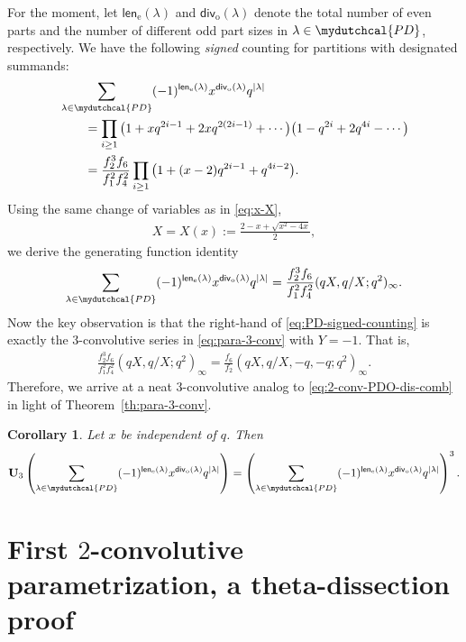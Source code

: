 \documentclass[12pt,reqno]{amsart}
\numberwithin{equation}{section}
\theoremstyle{plain}
\newtheorem{corollary}[theorem]{Corollary}
\theoremstyle{definition}
\theoremstyle{named}
\newcommand{\cPD}{\mydutchcal{PD}}
\newcommand{\dis}{\mathsf{div}}
\newcommand{\len}{\mathsf{len}}
\newcommand{\UU}{\mathbf{U}}
\begin{document}
For the moment, let $\len_{\mathrm{e}}(\lambda)$ and $\dis_{\mathrm{o}}(\lambda)$ denote the total number of even parts and the number of different odd part sizes in $\lambda\in \cPD$, respectively. We have the following \emph{signed} counting for partitions with designated summands:
\begin{align*}
	&\sum_{\lambda\in\cPD}(-1)^{\len_{\mathrm{e}}(\lambda)}x^{\dis_{\mathrm{o}}(\lambda)}q^{|\lambda|} \\
	&\qquad= \prod_{i\ge 1} \big(1+xq^{2i-1}+2xq^{2(2i-1)}+\cdots\big) \big(1 - q^{2i} + 2q^{4i} - \cdots\big)\\
	&\qquad= \frac{f_2^3 f_6}{f_1^2 f_4^2} \prod_{i\ge 1}\big(1+(x-2)q^{2i-1}+q^{4i-2}\big).
\end{align*}
Using the same change of variables as in \eqref{eq:x-X},
\begin{align*}
	X = X(x):= \frac{2-x+\sqrt{x^2-4x}}{2},
\end{align*}
we derive the generating function identity
\begin{align}\label{eq:PD-signed-counting}
	\sum_{\lambda\in\cPD}(-1)^{\len_{\mathrm{e}}(\lambda)}x^{\dis_{\mathrm{o}}(\lambda)}q^{|\lambda|} = \frac{f_2^3 f_6}{f_1^2 f_4^2} (qX,q/X;q^2)_\infty.
\end{align}
Now the key observation is that the right-hand of \eqref{eq:PD-signed-counting} is exactly the $3$-convolutive series in \eqref{eq:para-3-conv} with $Y=-1$. That is,
\begin{align*}
	\frac{f_2^3 f_6}{f_1^2 f_4^2} (qX,q/X;q^2)_\infty = \frac{f_6}{f_2} (qX,q/X,-q,-q;q^2)_\infty.
\end{align*}
Therefore, we arrive at a neat $3$-convolutive analog to \eqref{eq:2-conv-PDO-dis-comb} in light of Theorem~\ref{th:para-3-conv}.

\begin{corollary}
	Let $x$ be independent of $q$. Then
	\begin{align}\label{eq:para-3-conv-PD}
		\UU_3\left(\sum_{\lambda\in\cPD}(-1)^{\len_{\mathrm{e}}(\lambda)}x^{\dis_{\mathrm{o}}(\lambda)}q^{|\lambda|}\right) = \left(\sum_{\lambda\in\cPD}(-1)^{\len_{\mathrm{e}}(\lambda)}x^{\dis_{\mathrm{o}}(\lambda)}q^{|\lambda|}\right)^3.
	\end{align}
\end{corollary}

\section{First $2$-convolutive parametrization, a theta-dissection proof}\label{sec:para-2}
\end{document}
